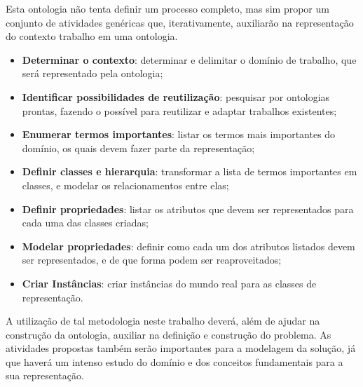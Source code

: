 Esta ontologia não tenta definir um processo completo, mas sim propor um conjunto de atividades genéricas que, iterativamente, auxiliarão na representação do contexto trabalho em uma ontologia.

\begin{itemize}
	\item \textbf{Determinar o contexto}: determinar e delimitar o domínio de trabalho, que será representado pela ontologia;
	\item \textbf{Identificar possibilidades de reutilização}: pesquisar por ontologias prontas, fazendo o possível para reutilizar e adaptar trabalhos existentes;
	\item \textbf{Enumerar termos importantes}: listar os termos mais importantes do domínio, os quais devem fazer parte da representação;
	\item \textbf{Definir classes e hierarquia}: transformar a lista de termos importantes em classes, e modelar os relacionamentos entre elas;
	\item \textbf{Definir propriedades}: listar os atributos que devem ser representados para cada uma das classes criadas;
	\item \textbf{Modelar propriedades}: definir como cada um dos atributos listados devem ser representados, e de que forma podem ser reaproveitados;
	\item \textbf{Criar Instâncias}: criar instâncias do mundo real para as classes de representação.
\end{itemize}

	A utilização de tal metodologia neste trabalho deverá, além de ajudar na construção da ontologia, auxiliar na definição e construção do problema. As atividades propostas também serão importantes para a modelagem da solução, já que haverá um intenso estudo do domínio e dos conceitos fundamentais para a sua representação.

